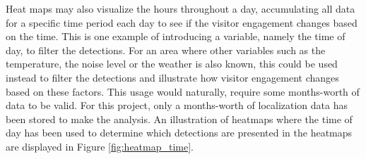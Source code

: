 Heat maps may also visualize the hours throughout a day, accumulating all data for a specific time period each day to see if the visitor engagement changes based on the time. This is one example of introducing a variable, namely the time of day, to filter the detections. For an area where other variables such as the temperature, the noise level or the weather is also known, this could be used instead to filter the detections and illustrate how visitor engagement changes based on these factors. This usage would naturally, require some months-worth of data to be valid. For this project, only a months-worth of localization data has been stored to make the analysis. An illustration of heatmaps where the time of day has been used to determine which detections are presented in the heatmaps are displayed in Figure \ref{fig:heatmap_time}.

